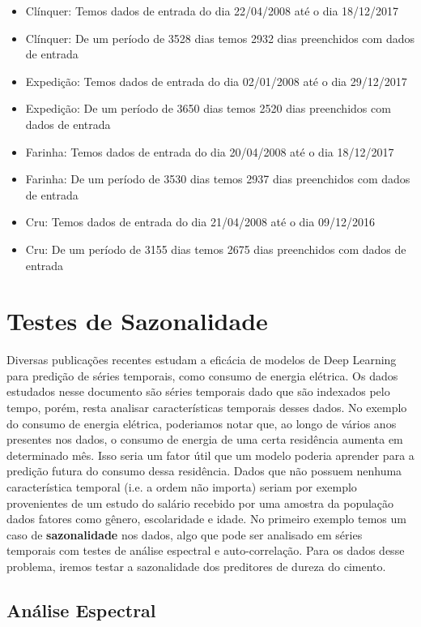 \documentclass[a4paper]{article}
\begin{document}
\begin{itemize}
\item Clínquer: Temos dados de entrada do dia 22/04/2008 até o dia 18/12/2017
\item Clínquer: De um período de 3528 dias temos 2932 dias preenchidos com dados de entrada
\item Expedição: Temos dados de entrada do dia 02/01/2008 até o dia 29/12/2017
\item Expedição: De um período de 3650 dias temos 2520 dias preenchidos com dados de entrada
\item Farinha: Temos dados de entrada do dia 20/04/2008 até o dia 18/12/2017
\item Farinha: De um período de 3530 dias temos 2937 dias preenchidos com dados de entrada
\item Cru: Temos dados de entrada do dia 21/04/2008 até o dia 09/12/2016
\item Cru: De um período de 3155 dias temos 2675 dias preenchidos com dados de entrada
\end{itemize}


\section{Testes de Sazonalidade}

Diversas publicações recentes estudam a eficácia de modelos de Deep Learning para predição de séries temporais, como consumo de energia elétrica. Os dados estudados nesse documento são séries temporais dado que são indexados pelo tempo, porém, resta analisar características temporais desses dados. No exemplo do consumo de energia elétrica, poderiamos notar que, ao longo de vários anos presentes nos dados, o consumo de energia de uma certa residência aumenta em determinado mês. Isso seria um fator útil que um modelo poderia aprender para a predição futura do consumo dessa residência. Dados que não possuem nenhuma característica temporal (i.e. a ordem não importa) seriam por exemplo provenientes de um estudo do salário recebido por uma amostra da população dados fatores como gênero, escolaridade e idade. No primeiro exemplo temos um caso de \textbf{sazonalidade} nos dados, algo que pode ser analisado em séries temporais com testes de análise espectral e auto-correlação. Para os dados desse problema, iremos testar a sazonalidade dos preditores de dureza do cimento.

\subsection{Análise Espectral}
\end{document}

